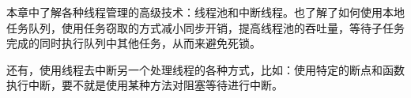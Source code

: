 
本章中了解各种线程管理的高级技术：线程池和中断线程。也了解了如何使用本地任务队列，使用任务窃取的方式减小同步开销，提高线程池的吞吐量，等待子任务完成的同时执行队列中其他任务，从而来避免死锁。

还有，使用线程去中断另一个处理线程的各种方式，比如：使用特定的断点和函数执行中断，要不就是使用某种方法对阻塞等待进行中断。